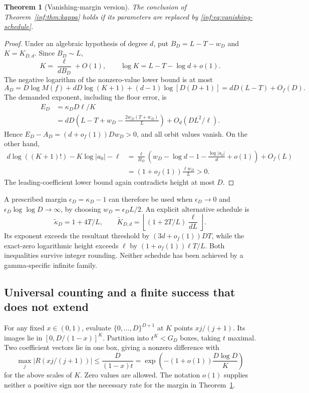 \documentclass[11pt,a4paper]{article}
\newtheorem{theorem}{Theorem}[section]
\theoremstyle{definition}
\theoremstyle{remark}
\numberwithin{equation}{section}
\begin{document}
\begin{theorem}[Vanishing-margin version]\label{inf:thm:vanishing}
The conclusion of Theorem~\ref{inf:thm:kappa} holds if its parameters are replaced by \eqref{inf:eq:vanishing-schedule}.
\end{theorem}
\begin{proof}
Under an algebraic hypothesis of degree $d$, put $B_D=L-T-w_D$ and $K=K_{D,d}$. Since $B_D\sim L$,
\[
 K=\frac\ell{dB_D}+O(1),\qquad\log K=L-T-\log d+o(1).
\]
The negative logarithm of the nonzero-value lower bound is at most
\[
 A_D=D\log M(f)+dD\log(K+1)+(d-1)\log[D(D+1)]
     =dD(L-T)+O_f(D).
\]
The demanded exponent, including the floor error, is
\begin{align*}
 E_D&=\kappa_DD\ell/K\\
 &=dD\left(L-T+w_D-\frac{2w_D(T+w_D)}L\right)
       +O_d(DL^2/\ell).
\end{align*}
Hence $E_D-A_D=(d+o_f(1))Dw_D>0$, and all orbit values vanish. On the other hand,
\begin{align*}
 d\log((K+1)!)-K\log|a_0|-\ell
 &=\frac\ell{B_D}\left(w_D-\log d-1-\frac{\log|a_0|}d+o(1)\right)
       +O_f(L)\\
 &=(1+o_f(1))\frac{\ell w_D}L>0.
\end{align*}
The leading-coefficient lower bound again contradicts height at most $D$.
\end{proof}
A prescribed margin $\epsilon_D=\kappa_D-1$ can therefore be used when
$\epsilon_D\to0$ and $\epsilon_D\log\log D\to\infty$, by choosing $w_D=\epsilon_DL/2$. An explicit alternative schedule is
\[
 \widetilde\kappa_D=1+4T/L,\qquad
 \widetilde K_{D,d}=\left\lfloor(1+2T/L)\frac\ell{dL}\right\rfloor.
\]
Its exponent exceeds the resultant threshold by $(3d+o_f(1))DT$, while the exact-zero logarithmic height exceeds $\ell$ by $(1+o_f(1))\ell T/L$. Both inequalities survive integer rounding. Neither schedule has been achieved by a gamma-specific infinite family.

\subsection{Universal counting and a finite success that does not extend}
\label{inf:sub:orbit-feasibility}
For any fixed $x\in(0,1)$, evaluate $\{0,\ldots,D\}^{D+1}$ at $K$ points $xj/(j+1)$. Its images lie in $[0,D/(1-x)]^K$. Partition into $t^K<G_D$ boxes, taking $t$ maximal. Two coefficient vectors lie in one box, giving a nonzero difference with
\[
 \max_j|R(xj/(j+1))|\le\frac{D}{(1-x)t}
 =\exp\left(-(1+o(1))\frac{D\log D}{K}\right)
\]
for the above scales of $K$. Zero values are allowed. The notation $o(1)$ supplies neither a positive sign nor the necessary rate for the margin in Theorem~\ref{inf:thm:vanishing}.
\end{document}
